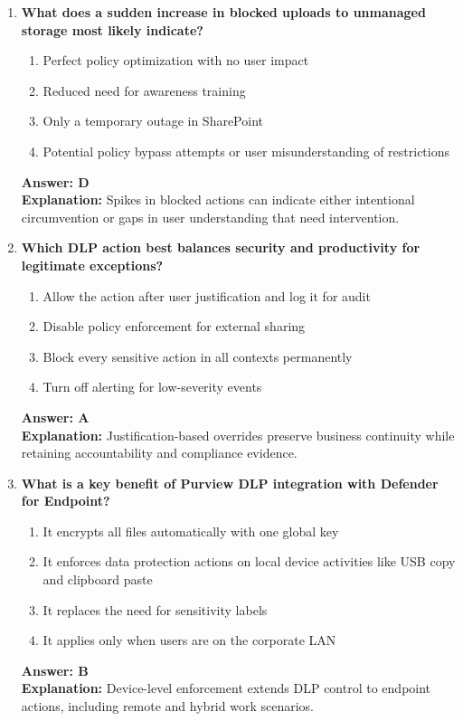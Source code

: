 \documentclass[10pt]{article}
\begin{document}
\begin{enumerate}[leftmargin=*]
\item \textbf{What does a sudden increase in blocked uploads to unmanaged storage most likely indicate?}
\begin{enumerate}[label=\Alph*.]
  \item Perfect policy optimization with no user impact
  \item Reduced need for awareness training
  \item Only a temporary outage in SharePoint
  \item Potential policy bypass attempts or user misunderstanding of restrictions
\end{enumerate}
\textbf{Answer: D}\\
\textbf{Explanation:} Spikes in blocked actions can indicate either intentional circumvention or gaps in user understanding that need intervention.

\item \textbf{Which DLP action best balances security and productivity for legitimate exceptions?}
\begin{enumerate}[label=\Alph*.]
  \item Allow the action after user justification and log it for audit
  \item Disable policy enforcement for external sharing
  \item Block every sensitive action in all contexts permanently
  \item Turn off alerting for low-severity events
\end{enumerate}
\textbf{Answer: A}\\
\textbf{Explanation:} Justification-based overrides preserve business continuity while retaining accountability and compliance evidence.

\item \textbf{What is a key benefit of Purview DLP integration with Defender for Endpoint?}
\begin{enumerate}[label=\Alph*.]
  \item It encrypts all files automatically with one global key
  \item It enforces data protection actions on local device activities like USB copy and clipboard paste
  \item It replaces the need for sensitivity labels
  \item It applies only when users are on the corporate LAN
\end{enumerate}
\textbf{Answer: B}\\
\textbf{Explanation:} Device-level enforcement extends DLP control to endpoint actions, including remote and hybrid work scenarios.


\end{enumerate}
\end{document}
